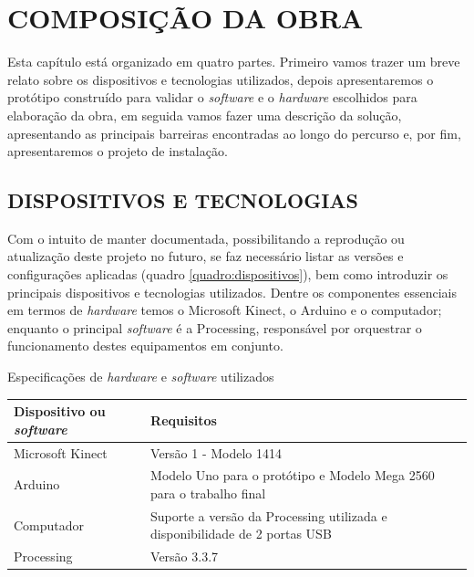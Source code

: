 \chapter{COMPOSIÇÃO DA OBRA}
Esta capítulo está organizado em quatro partes. Primeiro vamos trazer um breve relato sobre os dispositivos e tecnologias utilizados, depois apresentaremos o protótipo construído para validar o \textit{software} e o \textit{hardware} escolhidos para elaboração da obra, em seguida vamos fazer uma descrição da solução, apresentando as principais barreiras encontradas ao longo do percurso e, por fim, apresentaremos o projeto de instalação. 

\section{DISPOSITIVOS E TECNOLOGIAS}

Com o intuito de manter documentada, possibilitando a reprodução ou atualização deste projeto no futuro, se faz necessário listar as versões e configurações aplicadas (quadro \ref{quadro:dispositivos}), bem como introduzir os principais dispositivos e tecnologias utilizados. Dentre os componentes essenciais em termos de \textit{hardware} temos o Microsoft Kinect, o Arduino e o computador; enquanto o principal \textit{software} é a Processing, responsável por orquestrar o funcionamento destes equipamentos em conjunto. 


\begin{quadro}[H]
\caption{\label{quadro:dispositivos}Especificações de \textit{hardware} e \textit{software} utilizados}
\begin{center}  
  \begin{tabulary}{0.8\textwidth}{|L|L|}
  
  \hline
  \textbf{Dispositivo ou \textit{software}} & \textbf{Requisitos} \\ \hline
  Microsoft Kinect  & Versão 1 - Modelo 1414 \\ \hline
  Arduino & Modelo Uno para o protótipo e Modelo Mega 2560 para o trabalho final \\ \hline
  Computador & Suporte a versão da Processing utilizada e disponibilidade de 2 portas USB \\ \hline
  Processing & Versão 3.3.7 \\ \hline
  \end{tabulary}
\end{center}
\vspace*{-0,7cm}
\\
\end{quadro}



